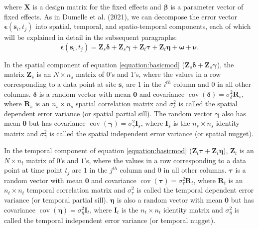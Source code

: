 \documentclass[smallextended]{svjour3}       %
\begin{document}
\noindent where \(\mathbf{X}\) is a design matrix for the fixed effects
and \(\bm{\beta}\) is a parameter vector of fixed effects. As in Dumelle
et al. (2021), we can decompose the error vector
\(\bm{\epsilon}(\mathbf{s}_{i}, t_j)\) into spatial, temporal, and
spatio-temporal components, each of which will be explained in detail in
the subsequent paragraphs: \mbox{}
\begin{equation} \label{equation:basicmod}
\bm{\epsilon}(\mathbf{s}_{i}, t_j) = \mathbf{Z}_{s} \bm{\delta} + \mathbf{Z}_{s} \bm{\gamma} + \mathbf{Z}_t \bm{\tau} + \mathbf{Z}_t \bm{\eta} + \bm{\omega} + \bm{\nu}.
\end{equation}

In the spatial component of equation \ref{equation:basicmod}
(\(\mathbf{Z}_{s} \bm{\delta} + \mathbf{Z}_{s} \bm{\gamma}\)), the
matrix \(\mathbf{Z}_{s}\) is an \(N \times n_s\) matrix of \(0\)'s and
\(1\)'s, where the values in a row corresponding to a data point at site
\(\mathbf{s}_{i}\) are \(1\) in the \(i^{th}\) column and \(0\) in all
other columns. \(\bm{\delta}\) is a random vector with mean
\(\mathbf{0}\) and covariance
\(\mathop{\mathrm{{cov}}}(\bm{\delta}) = \sigma^2_{\delta} \mathbf{R}_{s}\),
where \(\mathbf{R}_s\) is an \(n_s \times n_s\) spatial correlation
matrix and \(\sigma^2_{\delta}\) is called the spatial dependent error
variance (or spatial partial sill). The random vector \(\bm{\gamma}\)
also has mean \(\mathbf{0}\) but has covariance
\(\mathop{\mathrm{{cov}}}(\bm{\gamma}) = \sigma^2_{\gamma} \mathbf{I}_{s}\),
where \(\mathbf{I}_s\) is the \(n_s \times n_s\) identity matrix and
\(\sigma^2_{\gamma}\) is called the spatial independent error variance
(or spatial nugget).

In the temporal component of equation \ref{equation:basicmod}
(\(\mathbf{Z}_t \bm{\tau} + \mathbf{Z}_t \bm{\eta}\)),
\(\mathbf{Z}_{t}\) is an \(N \times n_t\) matrix of \(0\)'s and \(1\)'s,
where the values in a row corresponding to a data point at time point
\(t_j\) are \(1\) in the \(j^{th}\) column and \(0\) in all other
columns. \(\bm{\tau}\) is a random vector with mean \(\mathbf{0}\) and
covariance
\(\mathop{\mathrm{{cov}}}(\bm{\tau}) = \sigma^2_{\tau} \mathbf{R}_{t}\),
where \(\mathbf{R}_t\) is an \(n_t \times n_t\) temporal correlation
matrix and \(\sigma^2_{\tau}\) is called the temporal dependent error
variance (or temporal partial sill). \(\bm{\eta}\) is also a random
vector with mean \(\mathbf{0}\) but has covariance
\(\mathop{\mathrm{{cov}}}(\bm{\eta}) = \sigma^2_{\eta} \mathbf{I}_{t}\),
where \(\mathbf{I}_t\) is the \(n_t \times n_t\) identity matrix and
\(\sigma^2_{\eta}\) is called the temporal independent error variance
(or temporal nugget).
\end{document}
